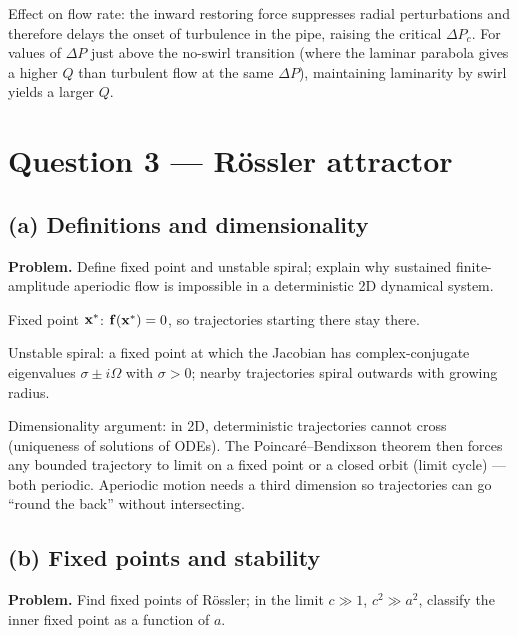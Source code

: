\documentclass[11pt]{article}
\begin{document}
Effect on flow rate: the inward restoring force suppresses radial perturbations and therefore delays the onset of turbulence in the pipe, raising the critical $\Delta P_c$. For values of $\Delta P$ just above the no-swirl transition (where the laminar parabola gives a higher $Q$ than turbulent flow at the same $\Delta P$), maintaining laminarity by swirl yields a larger $Q$.

\section*{Question 3 --- R\"ossler attractor}

\subsection*{(a) Definitions and dimensionality}

\textbf{Problem.} Define fixed point and unstable spiral; explain why sustained finite-amplitude aperiodic flow is impossible in a deterministic 2D dynamical system.

Fixed point $\vb x^\ast$: $\vb f(\vb x^\ast) = 0$, so trajectories starting there stay there.

Unstable spiral: a fixed point at which the Jacobian has complex-conjugate eigenvalues $\sigma\pm i\Omega$ with $\sigma>0$; nearby trajectories spiral outwards with growing radius.

Dimensionality argument: in 2D, deterministic trajectories cannot cross (uniqueness of solutions of ODEs). The Poincar\'e--Bendixson theorem then forces any bounded trajectory to limit on a fixed point or a closed orbit (limit cycle) --- both periodic. Aperiodic motion needs a third dimension so trajectories can go ``round the back'' without intersecting.

\subsection*{(b) Fixed points and stability}

\textbf{Problem.} Find fixed points of R\"ossler; in the limit $c\gg 1$, $c^2\gg a^2$, classify the inner fixed point as a function of $a$.
\end{document}
